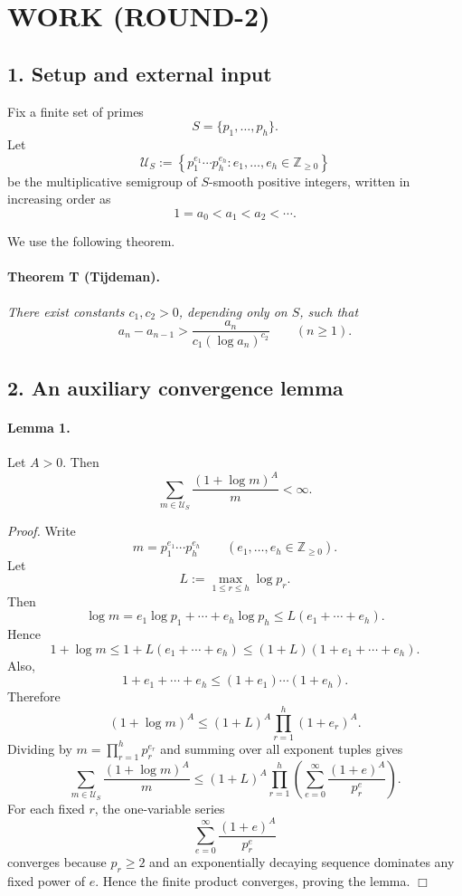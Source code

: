 \section{WORK (ROUND-2)}

\subsection*{1. Setup and external input}

Fix a finite set of primes
\[
S=\{p_1,\dots,p_h\}.
\]
Let
\[
\mathcal U_S:=\left\{p_1^{e_1}\cdots p_h^{e_h}: e_1,\dots,e_h\in \mathbb Z_{\ge 0}\right\}
\]
be the multiplicative semigroup of \(S\)-smooth positive integers, written in increasing order as
\[
1=a_0<a_1<a_2<\cdots.
\]

We use the following theorem.

\paragraph{Theorem T (Tijdeman).}
\emph{There exist constants \(c_1,c_2>0\), depending only on \(S\), such that}
\[
a_n-a_{n-1}>\frac{a_n}{c_1(\log a_n)^{c_2}}
\qquad (n\ge 1).
\]

\subsection*{2. An auxiliary convergence lemma}

\paragraph{Lemma 1.}
Let \(A>0\). Then
\[
\sum_{m\in \mathcal U_S}\frac{(1+\log m)^A}{m}<\infty.
\]

\emph{Proof.}
Write
\[
m=p_1^{e_1}\cdots p_h^{e_h}
\qquad (e_1,\dots,e_h\in \mathbb Z_{\ge 0}).
\]
Let
\[
L:=\max_{1\le r\le h}\log p_r.
\]
Then
\[
\log m = e_1\log p_1+\cdots+e_h\log p_h\le L(e_1+\cdots+e_h).
\]
Hence
\[
1+\log m\le 1+L(e_1+\cdots+e_h)\le (1+L)(1+e_1+\cdots+e_h).
\]
Also,
\[
1+e_1+\cdots+e_h \le (1+e_1)\cdots(1+e_h).
\]
Therefore
\[
(1+\log m)^A \le (1+L)^A \prod_{r=1}^h (1+e_r)^A.
\]
Dividing by \(m=\prod_{r=1}^h p_r^{e_r}\) and summing over all exponent tuples gives
\[
\sum_{m\in \mathcal U_S}\frac{(1+\log m)^A}{m}
\le
(1+L)^A
\prod_{r=1}^h \left(\sum_{e=0}^{\infty}\frac{(1+e)^A}{p_r^e}\right).
\]
For each fixed \(r\), the one-variable series
\[
\sum_{e=0}^{\infty}\frac{(1+e)^A}{p_r^e}
\]
converges because \(p_r\ge 2\) and an exponentially decaying sequence dominates any fixed power of \(e\). Hence the finite product converges, proving the lemma.
\hfill\(\Box\)

